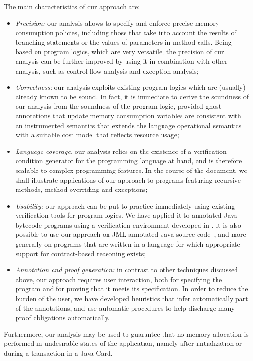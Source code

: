 The main characteristics of our approach are:
\begin{itemize}
\item \emph{Precision:} our analysis allows to specify and enforce
precise memory consumption policies, including those that take
into account the results of branching statements or the values of
parameters in method calls. Being based on program logics, which are
very versatile, the precision of our analysis can be further improved
by using it in combination with other analysis, such as control flow
analysis and exception analysis;


\item \emph{Correctness:} our analysis exploits existing program logics
which are (usually) already known to be sound. In fact, it is immediate
to derive the soundness of our analysis from the soundness of the program
logic, provided ghost annotations that update memory consumption variables
are consistent with an instrumented semantics that  extends the language
operational semantics with a suitable cost model that reflects resource
usage;

\item \emph{Language coverage:} our analysis relies on the existence
of a verification condition generator for the programming language at
hand, and is therefore scalable to complex programming features.  In
the course of the document, we shall illustrate applications of our
approach to programs featuring recursive methods, method
overriding and exceptions;


\item \emph{Usability:} our approach can be put to practice
immediately using existing verification tools for program logics. We
have applied it to annotated Java bytecode programs using a
verification environment developed in \cite{BP06:sac}. It is also
possible to use our approach on JML annotated Java source
code~\cite{BRL-JACK}, and more generally on programs that are written
in a language for which appropriate support for contract-based
reasoning exists;




\item \emph{Annotation and proof generation:} in contrast to other
techniques discussed above, our approach requires user interaction,
both for specifying the program and for proving that it meets its
specification.  In order to reduce the burden of the user, we have
developed heuristics that infer automatically part of the annotations,
and use automatic procedures to help discharge many proof obligations
automatically.
\end{itemize}
Furthermore, our analysis may be used to guarantee that no memory
allocation is performed in undesirable states of the application,
namely after initialization or during a transaction in a Java Card.

